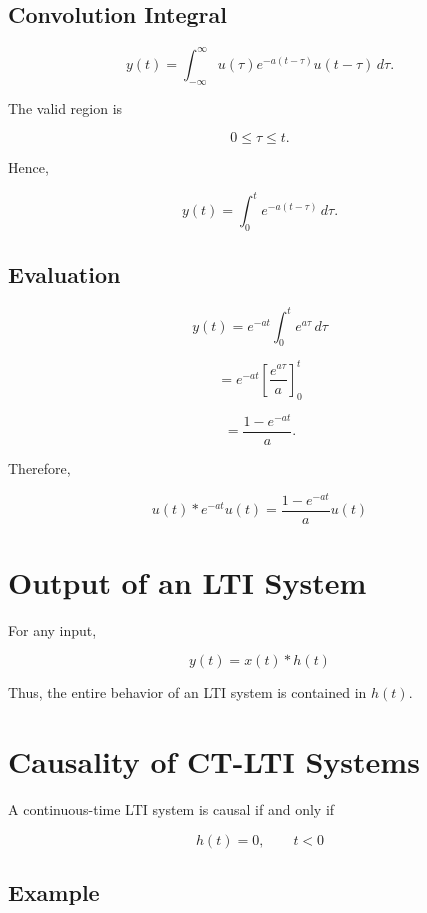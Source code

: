 \subsection{Convolution Integral}

\[
y(t)=\int_{-\infty}^{\infty}
u(\tau)e^{-a(t-\tau)}u(t-\tau)\,d\tau.
\]

The valid region is

\[
0\le\tau\le t.
\]

Hence,

\[
y(t)=\int_0^t e^{-a(t-\tau)}\,d\tau.
\]


\subsection{Evaluation}

\[
y(t)=e^{-at}\int_0^t e^{a\tau}\,d\tau
\]

\[
=e^{-at}\left[\frac{e^{a\tau}}{a}\right]_0^t
\]

\[
=\frac{1-e^{-at}}{a}.
\]

Therefore,

\[
\boxed{
u(t)*e^{-at}u(t)
=
\frac{1-e^{-at}}{a}u(t)
}
\]


\section{Output of an LTI System}

For any input,

\[
\boxed{
y(t)=x(t)*h(t)
}
\]

Thus, the entire behavior of an LTI system is contained in \(h(t)\).


\section{Causality of CT-LTI Systems}

A continuous-time LTI system is causal if and only if

\[
\boxed{
h(t)=0,\qquad t<0
}
\]


\subsection{Example}

